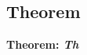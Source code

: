 \documentclass[a4paper,12pt]{article}
\begin{document}
\subsection*{Theorem}
\bf{Theorem:} \it{Th}


\begin{equation}
\end{equation}
\end{document}

